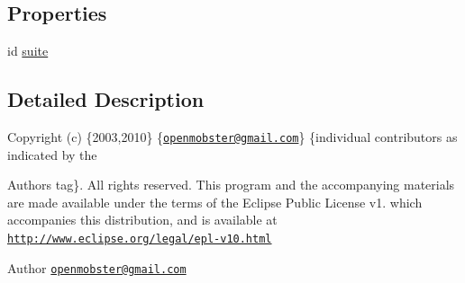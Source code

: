 \subsection*{\-Properties}
\begin{DoxyCompactItemize}
\item 
id \hyperlink{interface_test_a8431ebf7801aff3534684c3feaa672ba}{suite}
\end{DoxyCompactItemize}


\subsection{\-Detailed \-Description}
\-Copyright (c) \{2003,2010\} \{\href{mailto:openmobster@gmail.com}{\tt openmobster@gmail.\-com}\} \{individual contributors as indicated by the \begin{DoxyAuthor}{\-Authors}
tag\}. \-All rights reserved. \-This program and the accompanying materials are made available under the terms of the \-Eclipse \-Public \-License v1. which accompanies this distribution, and is available at \href{http://www.eclipse.org/legal/epl-v10.html}{\tt http\-://www.\-eclipse.\-org/legal/epl-\/v10.\-html}
\end{DoxyAuthor}
\begin{DoxyAuthor}{\-Author}
\href{mailto:openmobster@gmail.com}{\tt openmobster@gmail.\-com} 
\end{DoxyAuthor}


